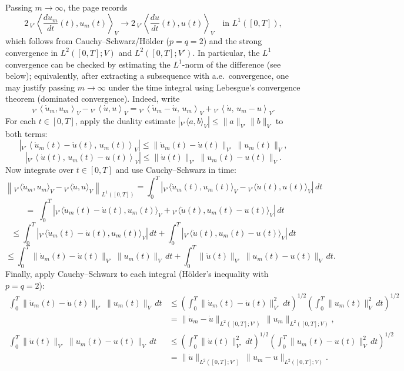 \documentclass[11pt]{article}
\theoremstyle{definition}
\theoremstyle{remark}
\begin{document}
Passing $m\to\infty$, the page records
\[
2\,{}_{V'}\left\langle \frac{du_m}{dt}(t),u_m(t)\right\rangle_{V}
\longrightarrow
2\,{}_{V'}\left\langle \frac{du}{dt}(t),u(t)\right\rangle_{V}
\quad\text{in }L^1([0,T]),
\]
which follows from Cauchy--Schwarz/H\"older ($p=q=2$) and the strong convergence in $L^2([0,T];V)$ and $L^2([0,T];V')$. In particular, the $L^1$ convergence can be checked by estimating the $L^1$-norm of the difference (see below); equivalently, after extracting a subsequence with a.e.\ convergence, one may justify passing $m\to\infty$ under the time integral using Lebesgue's convergence theorem (dominated convergence).
\noindent
Indeed, write
\[
{}_{V'}\left\langle \dot u_m,u_m\right\rangle_V
-
{}_{V'}\left\langle \dot u,u\right\rangle_V
=
{}_{V'}\left\langle \dot u_m-\dot u,\,u_m\right\rangle_V
+
{}_{V'}\left\langle \dot u,\,u_m-u\right\rangle_V.
\]
\noindent
For each $t\in[0,T]$, apply the duality estimate
$|{}_{V'}\langle a,b\rangle_V|\le \|a\|_{V'}\|b\|_V$ to both terms:
\[
\left|{}_{V'}\left\langle \dot u_m(t)-\dot u(t),\,u_m(t)\right\rangle_V\right|
\le
\|\dot u_m(t)-\dot u(t)\|_{V'}\,\|u_m(t)\|_{V},
\]
\[
\left|{}_{V'}\left\langle \dot u(t),\,u_m(t)-u(t)\right\rangle_V\right|
\le
\|\dot u(t)\|_{V'}\,\|u_m(t)-u(t)\|_{V}.
\]
\noindent
Now integrate over $t\in[0,T]$ and use Cauchy--Schwarz in time:
\[
\left\|{}_{V'}\langle \dot u_m,u_m\rangle_V-{}_{V'}\langle \dot u,u\rangle_V\right\|_{L^1([0,T])}
=
\int_0^T
\left|
{}_{V'}\langle \dot u_m(t),u_m(t)\rangle_V-{}_{V'}\langle \dot u(t),u(t)\rangle_V
\right|\,dt
\]
\[
\;=\;
\int_0^T
\left|
{}_{V'}\langle \dot u_m(t)-\dot u(t),u_m(t)\rangle_V
+
{}_{V'}\langle \dot u(t),u_m(t)-u(t)\rangle_V
\right|\,dt
\]
\[
\le
\int_0^T
\left|
{}_{V'}\langle \dot u_m(t)-\dot u(t),u_m(t)\rangle_V
\right|\,dt
+
\int_0^T
\left|
{}_{V'}\langle \dot u(t),u_m(t)-u(t)\rangle_V
\right|\,dt
\]
\[
\le
\int_0^T
\|\dot u_m(t)-\dot u(t)\|_{V'}\,\|u_m(t)\|_{V}\,dt
+
\int_0^T
\|\dot u(t)\|_{V'}\,\|u_m(t)-u(t)\|_{V}\,dt.
\]
Finally, apply Cauchy--Schwarz to each integral (H\"older's inequality with $p=q=2$):
\begin{align*}
\int_0^T
\|\dot u_m(t)-\dot u(t)\|_{V'}\,\|u_m(t)\|_{V}\,dt
&\le
\left(\int_0^T \|\dot u_m(t)-\dot u(t)\|_{V'}^2\,dt\right)^{1/2}
\left(\int_0^T \|u_m(t)\|_{V}^2\,dt\right)^{1/2} \\
&=
\|\dot u_m-\dot u\|_{L^2([0,T];V')}\,\|u_m\|_{L^2([0,T];V)},
\\[0.5em]
\int_0^T
\|\dot u(t)\|_{V'}\,\|u_m(t)-u(t)\|_{V}\,dt
&\le
\left(\int_0^T \|\dot u(t)\|_{V'}^2\,dt\right)^{1/2}
\left(\int_0^T \|u_m(t)-u(t)\|_{V}^2\,dt\right)^{1/2} \\
&=
\|\dot u\|_{L^2([0,T];V')}\,\|u_m-u\|_{L^2([0,T];V)}.
\end{align*}
\end{document}
